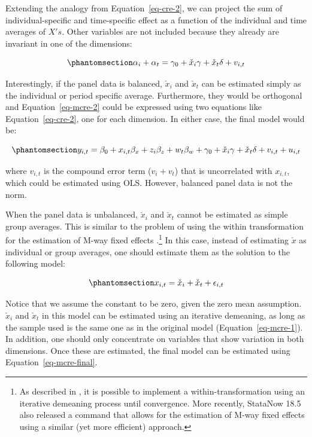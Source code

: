 \documentclass[bib]{statapress}
\begin{document}
Extending the analogy from Equation~\ref{eq-cre-2}, we can project the
sum of individual-specific and time-specific effect as a function of the
individual and time averages of \(X's\). Other variables are not
included because they already are invariant in one of the dimensions:

\begin{equation}\phantomsection\label{eq-mcre-2}{
\alpha_i + \alpha_t  = \gamma_0 + \check x_{i}\gamma + \check x_{t}\delta + v_{i,t}
}\end{equation}

Interestingly, if the panel data is balanced, \(\check x_{i}\) and
\(\check x_{t}\) can be estimated simply as the individual or period
specific average. Furthermore, they would be orthogonal and
Equation~\ref{eq-mcre-2} could be expressed using two equations like
Equation~\ref{eq-cre-2}, one for each dimension. In either case, the
final model would be:

\begin{equation}\phantomsection\label{eq-mcre-final}{y_{i,t} = \beta_0 + x_{i,t}\beta_x + z_{i}\beta_z + w_{t}\beta_w + \gamma_0 + \check x_{i}\gamma + \check x_{t}\delta+ v_{i,t} + u_{i,t}
}\end{equation}

where \(v_{i,t}\) is the compound error term (\(v_{i}+v_{t}\)) that is
uncorrelated with \(x_{i,t}\), which could be estimated using OLS.
However, balanced panel data is not the norm.

When the panel data is unbalanced, \(\check x_{i}\) and \(\check x_{t}\)
cannot be estimated as simple group averages. This is similar to the
problem of using the within transformation for the estimation of M-way
fixed effects \citep{rios2015, correia_2016}.\footnote{As described in
  \citet{rios2015}, it is possible to implement a within-transformation
  using an iterative demeaning process until convergence. More recently,
  StataNow 18.5 also released a command that allows for the estimation
  of M-way fixed effects using a similar (yet more efficient) approach.}
In this case, instead of estimating \(\check x\) as individual or group
averages, one should estimate them as the solution to the following
model:

\begin{equation}\phantomsection\label{eq-mcre-3}{x_{i,t} = \check x_{i} + \check x_{t} + \epsilon_{i,t}
}\end{equation}

Notice that we assume the constant to be zero, given the zero mean
assumption. \(\check x_{i}\) and \(\check x_{t}\) in this model can be
estimated using an iterative demeaning, as long as the sample used is
the same one as in the original model (Equation~\ref{eq-mcre-1}). In
addition, one should only concentrate on variables that show variation
in both dimensions. Once these are estimated, the final model can be
estimated using Equation~\ref{eq-mcre-final}.
\end{document}
